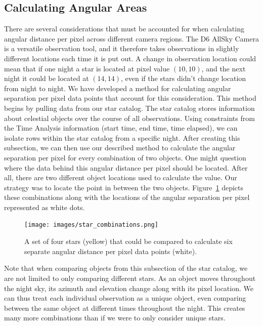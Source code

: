 \subsection{Calculating Angular Areas}

There are several considerations that must be accounted for when calculating angular distance per pixel across different camera regions.
The D6 AllSky Camera is a versatile observation tool, and it therefore takes observations in slightly different locations each time it is put out.
A change in observation location could mean that if one night a star is located at pixel value $(10,10)$, and the next night it could be located at $(14,14)$, even if the stars didn't change location from night to night.
We have developed a method for calculating angular separation per pixel data points that account for this consideration.
This method begins by pulling data from our star catalog.
The star catalog stores information about celestial objects over the course of all observations.
Using constraints from the Time Analysis information (start time, end time, time elapsed), we can isolate rows within the star catalog from a specific night.  
After creating this subsection, we can then use our described method to calculate the angular separation per pixel for every combination of two objects.
One might question where the data behind this angular distance per pixel should be located.
After all, there are two different object locations used to calculate the value.
Our strategy was to locate the point in between the two objects.  
Figure~\ref{starcombos} depicts these combinations along with the locations of the angular separation per pixel represented as white dots.

\begin{figure}[ht!]
  \centering
  \texttt{[image: images/star\_combinations.png]}
  \caption{A set of four stars (yellow) that could be compared to calculate six separate angular distance per pixel data points (white).}
  \label{starcombos}
\end{figure}

Note that when comparing objects from this subsection of the star catalog, we are not limited to only comparing different stars.
As an object moves throughout the night sky, its azimuth and elevation change along with its pixel location.
We can thus treat each individual observation as a unique object, even comparing between the same object at different times throughout the night.
This creates many more combinations than if we were to only consider unique stars.


